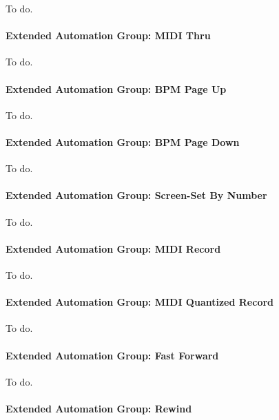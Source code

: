    To do.

\paragraph{Extended Automation Group: MIDI Thru}
\label{paragraph:seq64_rc_file_midi_ctrl_ex_thru}

   To do.

\paragraph{Extended Automation Group: BPM Page Up}
\label{paragraph:seq64_rc_file_midi_ctrl_ex_bpmpageup}

   To do.

\paragraph{Extended Automation Group: BPM Page Down}
\label{paragraph:seq64_rc_file_midi_ctrl_ex_bpmpageup}

   To do.

\paragraph{Extended Automation Group: Screen-Set By Number}
\label{paragraph:seq64_rc_file_midi_ctrl_ex_ssnumber}

   To do.

\paragraph{Extended Automation Group: MIDI Record}
\label{paragraph:seq64_rc_file_midi_ctrl_ex_mrecord}

   To do.

\paragraph{Extended Automation Group: MIDI Quantized Record}
\label{paragraph:seq64_rc_file_midi_ctrl_ex_qrecord}

   To do.

\paragraph{Extended Automation Group: Fast Forward}
\label{paragraph:seq64_rc_file_midi_ctrl_ex_fforward}

   To do.

\paragraph{Extended Automation Group: Rewind}
\label{paragraph:seq64_rc_file_midi_ctrl_ex_rewind}

